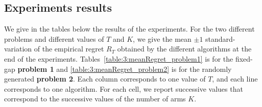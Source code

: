 \subsection{Experiments results}

We give in the tables below the results of the experiments. For the two different problems and different values of $T$ and $K$, we give the mean $\pm 1$ standard-variation of the empirical regret $R_T$ obtained by the different algorithms at the end of the experiments.
Tables~\ref{table:3:meanRegret_problem1} is for the fixed-gap \textbf{problem 1}
and \ref{table:3:meanRegret_problem2}  is for the randomly generated \textbf{problem 2}.
Each column corresponds to one value of $T$, and each line corresponds to one algorithm.
For each cell, we report successive values that correspond to the successive values of the number of arms $K$.

